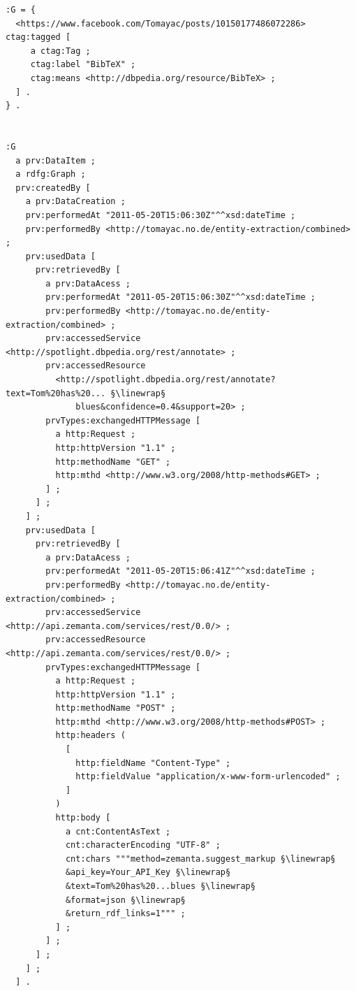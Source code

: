 \begin{lstlisting}[caption={[Shortened overview of the provenance
       RDF in Turtle syntax]{Shortened overview of the provenance
       RDF in Turtle syntax for an automatically annotated
       micropost}},
  label={code:provenance},escapechar=§]
:G = {
  <https://www.facebook.com/Tomayac/posts/10150177486072286> ctag:tagged [
     a ctag:Tag ;
     ctag:label "BibTeX" ;
     ctag:means <http://dbpedia.org/resource/BibTeX> ;
  ] .
} .


:G
  a prv:DataItem ;
  a rdfg:Graph ;
  prv:createdBy [
    a prv:DataCreation ;
    prv:performedAt "2011-05-20T15:06:30Z"^^xsd:dateTime ;
    prv:performedBy <http://tomayac.no.de/entity-extraction/combined> ;
    prv:usedData [
      prv:retrievedBy [
        a prv:DataAcess ;
        prv:performedAt "2011-05-20T15:06:30Z"^^xsd:dateTime ;
        prv:performedBy <http://tomayac.no.de/entity-extraction/combined> ;
        prv:accessedService <http://spotlight.dbpedia.org/rest/annotate> ;
        prv:accessedResource
          <http://spotlight.dbpedia.org/rest/annotate?text=Tom%20has%20... §\linewrap§
              blues&confidence=0.4&support=20> ;
        prvTypes:exchangedHTTPMessage [
          a http:Request ;
          http:httpVersion "1.1" ;
          http:methodName "GET" ;
          http:mthd <http://www.w3.org/2008/http-methods#GET> ;
        ] ;
      ] ;
    ] ;
    prv:usedData [
      prv:retrievedBy [
        a prv:DataAcess ;
        prv:performedAt "2011-05-20T15:06:41Z"^^xsd:dateTime ;
        prv:performedBy <http://tomayac.no.de/entity-extraction/combined> ;
        prv:accessedService <http://api.zemanta.com/services/rest/0.0/> ;
        prv:accessedResource <http://api.zemanta.com/services/rest/0.0/> ;
        prvTypes:exchangedHTTPMessage [
          a http:Request ;
          http:httpVersion "1.1" ;
          http:methodName "POST" ;
          http:mthd <http://www.w3.org/2008/http-methods#POST> ;
          http:headers (
            [
              http:fieldName "Content-Type" ;
              http:fieldValue "application/x-www-form-urlencoded" ;
            ]
          )
          http:body [
            a cnt:ContentAsText ;
            cnt:characterEncoding "UTF-8" ;
            cnt:chars """method=zemanta.suggest_markup §\linewrap§
            &api_key=Your_API_Key §\linewrap§
            &text=Tom%20has%20...blues §\linewrap§
            &format=json §\linewrap§
            &return_rdf_links=1""" ;
          ] ;
        ] ;
      ] ;
    ] ;
  ] .
\end{lstlisting}

